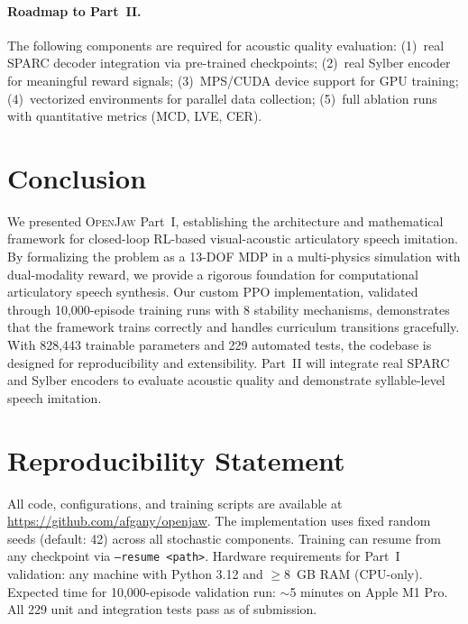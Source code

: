 \documentclass[11pt, a4paper]{article}
\newcommand{\openjaw}{\textsc{OpenJaw}}
\begin{document}
\paragraph{Roadmap to Part~II.}
The following components are required for acoustic quality evaluation: (1)~real SPARC decoder integration via pre-trained checkpoints; (2)~real Sylber encoder for meaningful reward signals; (3)~MPS/CUDA device support for GPU training; (4)~vectorized environments for parallel data collection; (5)~full ablation runs with quantitative metrics (MCD, LVE, CER).

\section{Conclusion}
\label{sec:conclusion}

We presented \openjaw{} Part~I, establishing the architecture and mathematical framework for closed-loop RL-based visual-acoustic articulatory speech imitation. By formalizing the problem as a 13-DOF MDP in a multi-physics simulation with dual-modality reward, we provide a rigorous foundation for computational articulatory speech synthesis. Our custom PPO implementation, validated through 10,000-episode training runs with 8 stability mechanisms, demonstrates that the framework trains correctly and handles curriculum transitions gracefully. With 828,443 trainable parameters and 229 automated tests, the codebase is designed for reproducibility and extensibility. Part~II will integrate real SPARC and Sylber encoders to evaluate acoustic quality and demonstrate syllable-level speech imitation.

\section*{Reproducibility Statement}

All code, configurations, and training scripts are available at \url{https://github.com/afgany/openjaw}. The implementation uses fixed random seeds (default: 42) across all stochastic components. Training can resume from any checkpoint via \texttt{--resume <path>}. Hardware requirements for Part~I validation: any machine with Python 3.12 and $\geq$8~GB RAM (CPU-only). Expected time for 10,000-episode validation run: $\sim$5 minutes on Apple M1 Pro. All 229 unit and integration tests pass as of submission.
\end{document}
